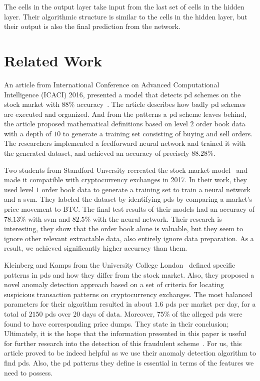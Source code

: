 The cells in the output layer take input from the last set of cells in the hidden layer. Their algorithmic structure is similar to the cells in the hidden layer, but their output is also the final prediction from the network.

\section{Related Work}\label{sec:related_work}
An article from International Conference on Advanced Computational Intelligence (ICACI) 2016, presented a model that detects \ac{pd} schemes on the stock market with $88\%$ accuracy~\cite{P&D_stock_price_manipulation}. The article describes how badly \ac{pd} schemes are executed and organized. And from the patterns a \ac{pd} scheme leaves behind, the article proposed mathematical definitions based on level $2$ order book data with a depth of $10$ to generate a training set consisting of buying and sell orders. The researchers implemented a feedforward neural network and trained it with the generated dataset, and achieved an accuracy of precisely $88.28\%$.

Two students from Standford Unversity recreated the stock market model~\cite{P&D_stock_price_manipulation} and made it compatible with cryptocurrency exchanges in 2017. In their work, they used level $1$ order book data to generate a training set to train a neural network and a \ac{svm}. They labeled the dataset by identifying \acp{pd} by comparing a market's price movement to BTC. The final test results of their models had an accuracy of $78.13\%$ with \ac{svm} and $82.5$\% with the neural network. Their research is interesting, they show that the order book alone is valuable, but they seem to ignore other relevant extractable data, also entirely ignore data preparation. As a result, we achieved significantly higher accuracy than them.

Kleinberg and Kamps from the University College London~\cite{P&D_to_the_moon} defined specific patterns in \acp{pd} and how they differ from the stock market. Also, they proposed a novel anomaly detection approach based on a set of criteria for locating suspicious transaction patterns on cryptocurrency exchanges. The most balanced parameters for their algorithm resulted in about $1.6$ \acp{pd} per market per day, for a total of $2150$ \acp{pd} over $20$ days of data. Moreover, $75\%$ of the alleged \acp{pd} were found to have corresponding price dumps. They state in their conclusion; Ultimately, it is the hope that the information presented in this paper is useful for further research into the detection of this fraudulent scheme~\cite{P&D_to_the_moon}. For us, this article proved to be indeed helpful as we use their anomaly detection algorithm to find \acp{pd}. Also, the \ac{pd} patterns they define is essential in terms of the features we need to possess.

